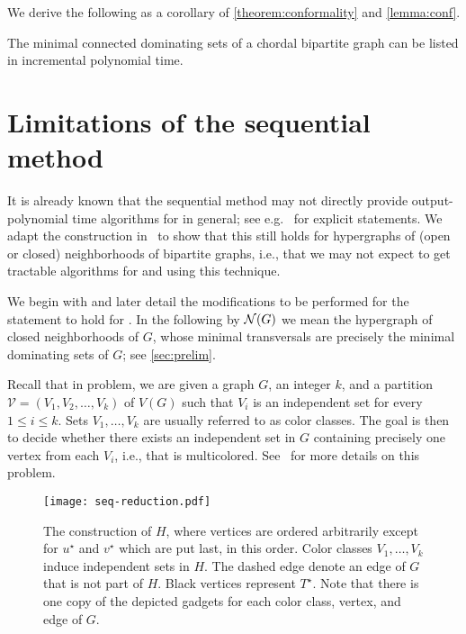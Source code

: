 We derive the following as a corollary of \autoref{theorem:conformality} and \autoref{lemma:conf}.

\begin{theorem}\label{thm:mcds-incp}
    The minimal connected dominating sets of a chordal bipartite graph can be listed in incremental polynomial time.
\end{theorem}

\section{Limitations of the sequential method}\label{sec:sequential-limit}

It is already known that the sequential method may not directly provide output-polynomial time algorithms for \transenum{} in general; see e.g.~\cite{bartier2024hypergraph} for explicit statements.
We adapt the construction in~\cite{bartier2024hypergraph} to show that this still holds for hypergraphs of (open or closed) neighborhoods of bipartite graphs, i.e., that we may not expect to get tractable algorithms for \tdomenum{} and \domenum{} using this technique.

We begin with \domenum{} and later detail the modifications to be performed for the statement to hold for \tdomenum{}.
In the following by $\mathcal{N}(G)$ we mean the hypergraph of closed neighborhoods of $G$, whose minimal transversals are precisely the minimal dominating sets of $G$; see \autoref{sec:prelim}.

Recall that in \mcis{} problem, we are given a graph $G$, an integer $k$, and a
partition $\mathcal{V}=(V_1, V_2, \dots, V_k)$ of $V(G)$ such that $V_i$ is an independent set for every $1\leq i \leq k$.
Sets $V_1,\dots,V_k$ are usually referred to as color classes.
The goal is then to decide whether there exists an independent set in $G$ containing precisely one vertex from each $V_i$, i.e., that is multicolored.
See~\cite{cygan2015parameterized} for more details on this problem.

\begin{figure}
    \centering
    \texttt{[image: seq-reduction.pdf]}
\caption{The construction of $H$, where vertices are ordered arbitrarily except for $u^\star$ and $v^\star$ which are put last, in this order. Color classes $V_1,\dots,V_k$ induce independent sets in $H$. The dashed edge denote an edge of $G$ that is not part of $H$. Black vertices represent $T^\star$. Note that there is one copy of the depicted gadgets for each color class, vertex, and edge of $G$.}\label{fig:example-reduction}
\end{figure}

